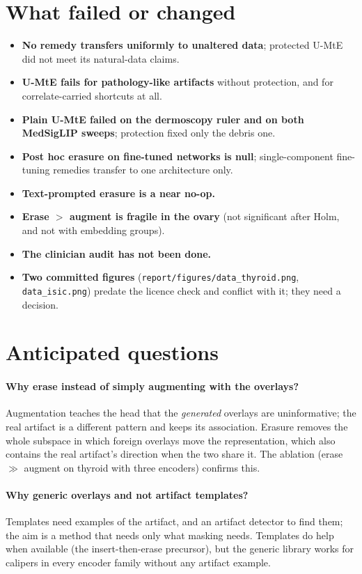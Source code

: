 \section{What failed or changed}
\begin{itemize}[leftmargin=*]\itemsep1pt
\item \textbf{No remedy transfers uniformly to unaltered data}; protected U-MtE did not meet its natural-data claims.
\item \textbf{U-MtE fails for pathology-like artifacts} without protection, and for correlate-carried shortcuts at all.
\item \textbf{Plain U-MtE failed on the dermoscopy ruler and on both MedSigLIP sweeps}; protection fixed only the debris one.
\item \textbf{Post hoc erasure on fine-tuned networks is null}; single-component fine-tuning remedies transfer to one
architecture only.
\item \textbf{Text-prompted erasure is a near no-op.}
\item \textbf{Erase $>$ augment is fragile in the ovary} (not significant after Holm, and not with embedding groups).
\item \textbf{The clinician audit has not been done.}
\item \textbf{Two committed figures} (\texttt{report/figures/data\_thyroid.png}, \texttt{data\_isic.png}) predate the licence
check and conflict with it; they need a decision.
\end{itemize}

\section{Anticipated questions}
\paragraph{Why erase instead of simply augmenting with the overlays?} Augmentation teaches the head that the \emph{generated}
overlays are uninformative; the real artifact is a different pattern and keeps its association. Erasure removes the whole
subspace in which foreign overlays move the representation, which also contains the real artifact's direction when the
two share it. The ablation (erase $\gg$ augment on thyroid with three encoders) confirms this.
\paragraph{Why generic overlays and not artifact templates?} Templates need examples of the artifact, and an artifact
detector to find them; the aim is a method that needs only what masking needs. Templates do help when available (the
insert-then-erase precursor), but the generic library works for calipers in every encoder family without any artifact
example.
